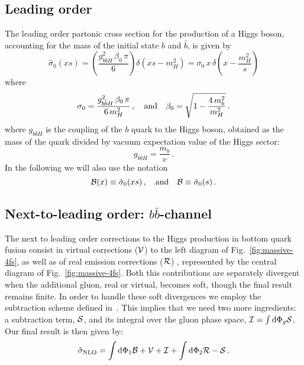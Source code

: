 \subsection{Leading order}
The leading order partonic cross section for the production of a Higgs
boson, accounting for the mass of the initial state $b$ and $\bar{b}$,
is given by
\begin{equation}
  \label{eq:bbh-lo}
  \hat{\sigma}_{0}(xs) = \left( \frac{g_{b\bar{b}H}^2\,\beta_0\,\pi}{6}
  \right)\delta(xs -m_H^2) = \sigma_0 \,x\,\delta\left( x-\frac{m_H^2}{s} \right)
\end{equation}
where 
\begin{equation}
  \label{eq:s0}
  \sigma_0 = \frac{g_{b\bar{b}H}^2 \,\beta_0 \, \pi}{6\,m_H^2}\,,
  \quad {\rm and}\quad  \beta_0 = \sqrt{1-\frac{4\,m_b^2}{m_H^2}}\,.
\end{equation}
where $g_{b\bar{b}H}$ is the coupling of the $b$ quark to the Higgs
boson, obtained as the mass of the quark divided by vacuum expectation
value of the Higgs sector:
\begin{equation}
  g_{b\bar{b}H} = \frac{m_b}{v}\,.
\end{equation}
In the following we will also use the notation
\begin{equation}
  {\cal B}(x) \equiv \hat{\sigma}_{0}(xs)\,,\quad {\rm and} \quad
  {\cal B} \equiv \hat{\sigma}_{0}(s)\,.
\end{equation}

\subsection{Next-to-leading order: $b\bar{b}$-channel}
The next to leading order corrections to the Higgs production in
bottom quark fusion consist in virtual corrections (${\cal V}$) to the
left diagram of Fig.~\ref{fig:massive-4fs}, as well as of real
emission corrections (${\cal R}$) , represented by the central diagram of
Fig.~\ref{fig:massive-4fs}.
Both this contributions are separately divergent when the additional
gluon, real or virtual, becomes soft, though the final result remains
finite. In order to handle these soft divergences we employ the
subtraction scheme defined in~\cite{Krauss:2017wmx}. This implies that
we need two more ingredients: a subtraction term, ${\cal S}$, and its
integral over the gluon phase space, ${\cal I} = \int{\rm d}\Phi_g{\cal S}$.
Our final result is then given by:
\begin{equation}
  \hat{\sigma}_{\rm NLO} = \int{\rm d}\Phi_1 {\cal B} +{\cal V}+{\cal
    I}+  \int{\rm d}\Phi_2 {\cal R} -{\cal S}\,.
\end{equation}

